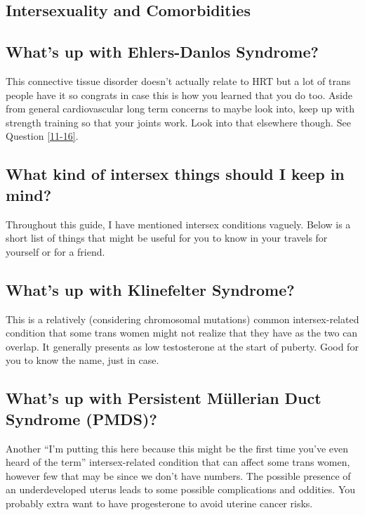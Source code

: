 \documentclass{article}
\begin{document}
{{\subsection*{Intersexuality and Comorbidities}

\subsection{What’s up with Ehlers-Danlos Syndrome?}

This connective tissue disorder doesn’t actually relate to HRT but a lot of trans people have it so congrats in case this is how you learned that you do too. Aside from general cardiovascular long term concerns to maybe look into, keep up with strength training so that your joints work. Look into that elsewhere though. See Question \ref{11-16}.

\subsection{What kind of intersex things should I keep in mind?}

Throughout this guide, I have mentioned intersex conditions vaguely. Below is a short list of things that might be useful for you to know in your travels for yourself or for a friend. 

\subsection{What’s up with Klinefelter Syndrome?}

This is a relatively (considering chromosomal mutations) common intersex-related condition that some trans women might not realize that they have as the two can overlap. It generally presents as low testosterone at the start of puberty. Good for you to know the name, just in case.

\subsection{What’s up with Persistent Müllerian Duct Syndrome (PMDS)?}

Another “I’m putting this here because this might be the first time you’ve even heard of the term” intersex-related condition that can affect some trans women, however few that may be since we don’t have numbers. The possible presence of an underdeveloped uterus leads to some possible complications and oddities. You probably extra want to have progesterone to avoid uterine cancer risks.

}}
\end{document}
